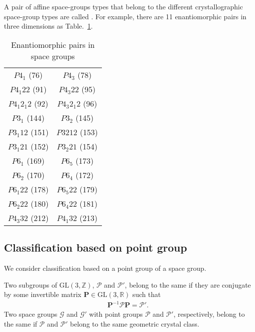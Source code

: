 A pair of affine space-groups types that belong to the different crystallographic space-group types are called .
For example, there are 11 enantiomorphic pairs in three dimensions as Table.~\ref{table:enantiomorphic-pairs-3d}.

\begin{table}[htb]
  \centering
  \caption{Enantiomorphic pairs in space groups}
  \label{table:enantiomorphic-pairs-3d}
  \begin{tabular}[h]{cc}
    $P 4_{1}$ (76)         & $P 4_{3}$ (78) \\
    $P 4_{1} 2 2$ (91)     & $P 4_{3} 2 2$ (95) \\
    $P 4_{1} 2_{1} 2$ (92) & $P 4_{3} 2_{1} 2$ (96) \\
    $P 3_{1}$ (144)        & $P 3_{2}$ (145) \\
    $P 3_{1} 1 2$ (151)    & $P 3{2} 1 2$ (153) \\
    $P 3_{1} 2 1$ (152)    & $P 3_{2} 2 1$ (154) \\
    $P 6_{1}$ (169)        & $P 6_{5}$ (173) \\
    $P 6_{2}$ (170)        & $P 6_{4}$ (172) \\
    $P 6_{1} 2 2$ (178)    & $P 6_{5} 2 2$ (179) \\
    $P 6_{2} 2 2$ (180)    & $P 6_{4} 2 2$ (181) \\
    $P 4_{3} 3 2$ (212)    & $P 4_{1} 3 2$ (213)
  \end{tabular}
\end{table}

\subsection{\label{sec:geometric-class}Classification based on point group}

We consider classification based on a point group of a space group.

\begin{screen}
  \begin{defn}
    Two subgroups of $\mathrm{GL}(3, \mathbb{Z})$, $\mathcal{P}$ and $\mathcal{P}'$, belong to the same  if they are conjugate by some invertible matrix $\bm{P} \in \mathrm{GL}(3, \mathbb{R})$ such that
    \begin{align}
       \bm{P}^{-1} \mathcal{P} \bm{P} = \mathcal{P}'.
    \end{align}
    Two space groups $\mathcal{G}$ and $\mathcal{G}'$ with point groups $\mathcal{P}$ and $\mathcal{P}'$, respectively, belong to the same  if $\mathcal{P}$ and $\mathcal{P}'$ belong to the same geometric crystal class.
  \end{defn}
\end{screen}

